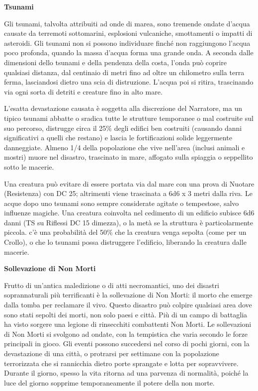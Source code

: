 \documentclass[a4paper,11pt,twoside,openany]{book}
\begin{document}
{\textbf{Tsunami}

Gli tsunami, talvolta attribuiti ad onde di marea, sono tremende ondate d'acqua causate da terremoti sottomarini, esplosioni vulcaniche, smottamenti o impatti di asteroidi. Gli tsunami non si possono individuare finché non raggiungono l'acqua poco profonda, quando la massa d'acqua forma una grande onda. A seconda dalle dimensioni dello tsunami e del­la pendenza della costa, l'onda può coprire qualsiasi distanza, dal centinaio di metri fino ad oltre un chilometro sulla terra ferma, lasciandosi dietro una scia di distruzione. L'acqua poi si ritira, trascinando via ogni sorta di detriti e creature fino in alto mare.

L'esatta devastazione causata è soggetta alla discrezione del Narratore, ma un tipico tsunami abbatte o sradica tutte le strutture temporanee o mal costruite sul suo percorso, distrugge circa il 25\% degli edifici ben costruiti (causando danni significativi a quelli che restano) e lascia le fortificazioni solide leggermente danneggiate. Almeno 1/4 della popolazione che vive nell'area (inclusi animali e mostri) muore nel disastro, trascinato in mare, affogato sulla spiaggia o seppellito sotto le macerie.

Una creatura può evitare di essere portata via dal mare con una prova di Nuotare (Resistenza) con DC 25; altrimenti viene trascinata a 6d6 x 3 metri dalla riva. Le acque dopo uno tsunami sono sempre considerate agitate o tempestose, salvo influenze magiche. Una creatura coinvolta nel cedimento di un edificio subisce 6d6 danni (TS su Riflessi DC 15 dimezza), o la metà se la struttura è particolarmente piccola. c'è una probabilità del 50\% che la creatura venga sepolta (come per un Crollo), o che lo tsunami possa distruggere l'edificio, liberando la creatura dalle macerie.

\textbf{Sollevazione di Non Morti}

Frutto di un'antica maledizione o di atti necromantici, uno dei disastri soprannaturali più terrificanti è la sollevazione di Non Morti: il morto che emerge dal­la tomba per reclamare il vivo. Questo disastro può colpire qualsiasi area dove sono stati sepolti dei morti, non solo paesi e città. Più di un campo di battaglia ha visto sorgere una legione di rinsecchiti combattenti Non Morti. Le sollevazioni di Non Morti si svolgono ad ondate, con la tempistica che varia secondo le forze principali in gioco. Gli eventi possono succedersi nel corso di pochi giorni, con la devastazione di una città, o protrarsi per settimane con la popolazione terrorizzata che si rannicchia dietro porte sprangate e lotta per sopravvivere. Durante il giorno, spesso la vita ritorna ad una parvenza di normalità, poiché la luce del giorno sopprime temporaneamente il potere della non morte.

}
\end{document}
